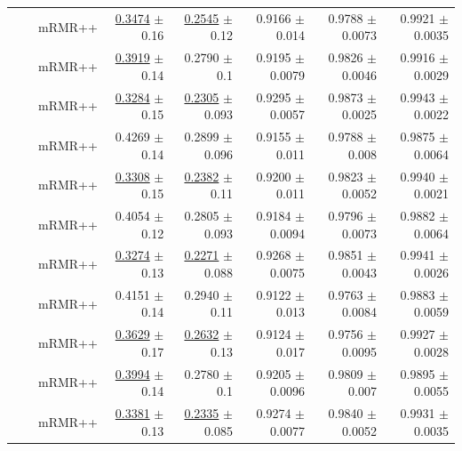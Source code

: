 \begin{longtable}{llp{}rrrrr}
 &  & mRMR++ & \underline{0.3474} {\scriptsize $\pm$ 0.16} & \underline{0.2545} {\scriptsize $\pm$ 0.12} & 0.9166 {\scriptsize $\pm$ 0.014} & 0.9788 {\scriptsize $\pm$ 0.0073} & 0.9921 {\scriptsize $\pm$ 0.0035} \\
 &  & mRMR++ & \underline{0.3919} {\scriptsize $\pm$ 0.14} & 0.2790 {\scriptsize $\pm$ 0.1} & 0.9195 {\scriptsize $\pm$ 0.0079} & 0.9826 {\scriptsize $\pm$ 0.0046} & 0.9916 {\scriptsize $\pm$ 0.0029} \\
 &  & mRMR++ & \underline{0.3284} {\scriptsize $\pm$ 0.15} & \underline{0.2305} {\scriptsize $\pm$ 0.093} & 0.9295 {\scriptsize $\pm$ 0.0057} & 0.9873 {\scriptsize $\pm$ 0.0025} & 0.9943 {\scriptsize $\pm$ 0.0022} \\
 &  & mRMR++ & 0.4269 {\scriptsize $\pm$ 0.14} & 0.2899 {\scriptsize $\pm$ 0.096} & 0.9155 {\scriptsize $\pm$ 0.011} & 0.9788 {\scriptsize $\pm$ 0.008} & 0.9875 {\scriptsize $\pm$ 0.0064} \\
 &  & mRMR++ & \underline{0.3308} {\scriptsize $\pm$ 0.15} & \underline{0.2382} {\scriptsize $\pm$ 0.11} & 0.9200 {\scriptsize $\pm$ 0.011} & 0.9823 {\scriptsize $\pm$ 0.0052} & 0.9940 {\scriptsize $\pm$ 0.0021} \\
 &  & mRMR++ & 0.4054 {\scriptsize $\pm$ 0.12} & 0.2805 {\scriptsize $\pm$ 0.093} & 0.9184 {\scriptsize $\pm$ 0.0094} & 0.9796 {\scriptsize $\pm$ 0.0073} & 0.9882 {\scriptsize $\pm$ 0.0064} \\
 &  & mRMR++ & \underline{0.3274} {\scriptsize $\pm$ 0.13} & \underline{0.2271} {\scriptsize $\pm$ 0.088} & 0.9268 {\scriptsize $\pm$ 0.0075} & 0.9851 {\scriptsize $\pm$ 0.0043} & 0.9941 {\scriptsize $\pm$ 0.0026} \\
 &  & mRMR++ & 0.4151 {\scriptsize $\pm$ 0.14} & 0.2940 {\scriptsize $\pm$ 0.11} & 0.9122 {\scriptsize $\pm$ 0.013} & 0.9763 {\scriptsize $\pm$ 0.0084} & 0.9883 {\scriptsize $\pm$ 0.0059} \\
 &  & mRMR++ & \underline{0.3629} {\scriptsize $\pm$ 0.17} & \underline{0.2632} {\scriptsize $\pm$ 0.13} & 0.9124 {\scriptsize $\pm$ 0.017} & 0.9756 {\scriptsize $\pm$ 0.0095} & 0.9927 {\scriptsize $\pm$ 0.0028} \\
 &  & mRMR++ & \underline{0.3994} {\scriptsize $\pm$ 0.14} & 0.2780 {\scriptsize $\pm$ 0.1} & 0.9205 {\scriptsize $\pm$ 0.0096} & 0.9809 {\scriptsize $\pm$ 0.007} & 0.9895 {\scriptsize $\pm$ 0.0055} \\
 &  & mRMR++ & \underline{0.3381} {\scriptsize $\pm$ 0.13} & \underline{0.2335} {\scriptsize $\pm$ 0.085} & 0.9274 {\scriptsize $\pm$ 0.0077} & 0.9840 {\scriptsize $\pm$ 0.0052} & 0.9931 {\scriptsize $\pm$ 0.0035} \\

\end{longtable}
